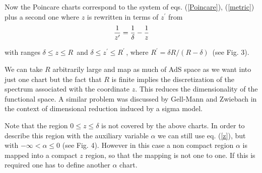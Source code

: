 \documentclass[a4paper,12pt]{article}
\begin{document}
Now the Poincare charts correspond to the system
of eqs. (\ref{Poincare}), (\ref{metric}) plus a second one where 
$z$ is rewritten in terms of $z^\prime$ from
\begin{eqnarray}
{1\over z^\prime} = {1\over \delta} - {1\over z} 
\end{eqnarray}

\noindent with ranges  $\delta \le z \le R \,$ 
and $\delta \le z^\prime \le R^\prime \,$, where 
$R^\prime= \delta R /( R - \delta )\,$ (see Fig. 3).

We can take $R$ arbitrarily large and map as much of AdS space as we want 
into just one chart but the fact that $R$ is finite implies the 
discretization of the spectrum associated with the coordinate $z$.
This reduces the dimensionality of the functional space.
A similar problem was discussed by Gell-Mann and Zwiebach\cite{GZ}
in the context of dimensional reduction induced by a sigma model.


Note that the region $0\le z \le \delta$ is not covered by the above charts.
In order to describe this region with the auxiliary variable $\alpha$ we can
still use eq. (\ref{z}), but with $-\infty < \alpha \le 0$ (see Fig. 4). 
However in this case a non compact region $\alpha$ is mapped into a compact 
$z$ region, so that the mapping is not one to one. If this is required one 
has to define another $\alpha$ chart.
\end{document}
